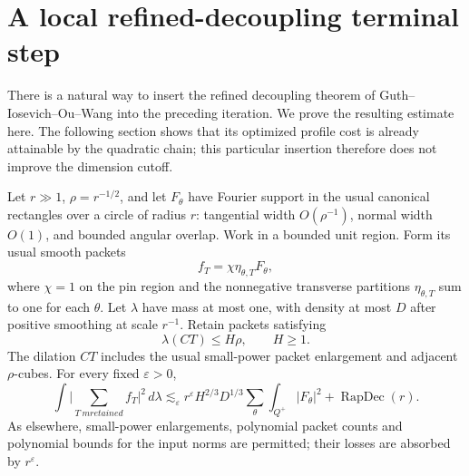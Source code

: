 \section{A local refined-decoupling terminal step}
\label{localdec:section}

There is a natural way to insert the refined decoupling theorem of
Guth--Iosevich--Ou--Wang \cite[Theorem 4.2 and Corollary 4.3]{giow}
into the preceding iteration. We prove the resulting estimate here.
The following section shows that its optimized profile cost is already
attainable by the quadratic chain; this particular insertion therefore
does not improve the dimension cutoff.

\begin{lemma}\label{localdec:packet}
Let \(r\gg1\), \(\rho=r^{-1/2}\), and let \(F_\theta\) have Fourier
support in the usual canonical rectangles over a circle of radius
\(r\): tangential width \(O(\rho^{-1})\), normal width \(O(1)\), and
bounded angular overlap. Work in a bounded unit region. Form its usual
smooth packets
\[
 f_T=\chi\eta_{\theta,T}F_\theta,
\]
where \(\chi=1\) on the pin region and the nonnegative transverse
partitions \(\eta_{\theta,T}\) sum to one for each \(\theta\).
Let \(\lambda\) have mass at most one, with density at most \(D\)
after positive smoothing at scale \(r^{-1}\). Retain packets satisfying
\[
 \lambda(CT)\le H\rho,\qquad H\ge1.
\]
The dilation \(CT\) includes the usual small-power packet enlargement
and adjacent \(\rho\)-cubes. For every fixed \(\varepsilon>0\),
\begin{equation}\label{localdec:estimate}
 \int\Big|\sum_{T\ {
m retained}} f_T\Big|^2\,d\lambda
 \lesssim_\varepsilon
 r^\varepsilon H^{2/3}D^{1/3}
 \sum_\theta\int_{Q^+}|F_\theta|^2
 +\operatorname{RapDec}(r).
\end{equation}
As elsewhere, small-power enlargements, polynomial packet counts and
polynomial bounds for the input norms are permitted; their losses are
absorbed by \(r^\varepsilon\).
\end{lemma}

